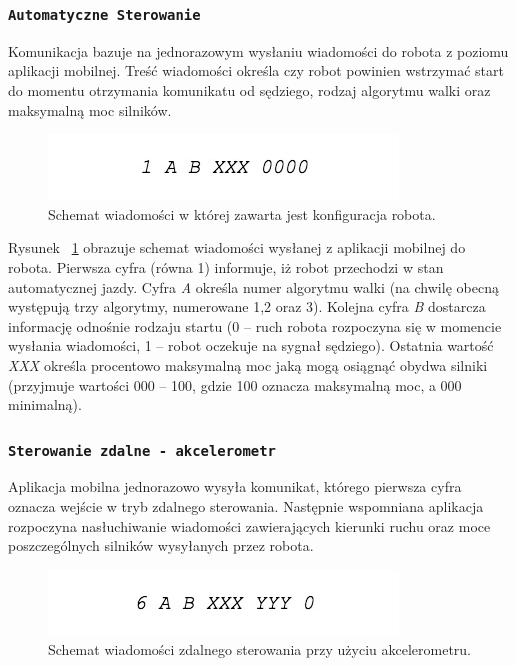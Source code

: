  \subsubsection{\lstinline$Automatyczne Sterowanie$}

Komunikacja bazuje na jednorazowym wysłaniu wiadomości do robota z poziomu aplikacji mobilnej. Treść wiadomości określa czy robot powinien wstrzymać start do momentu otrzymania komunikatu od sędziego, rodzaj algorytmu walki oraz maksymalną moc silników.

\begin{figure}[H]
	\centering
		\includegraphics[width=0.75\linewidth]{pic03/automatic.jpg}
	\caption{Schemat wiadomości w której zawarta jest konfiguracja robota.}
	\label{fig:automatic}	
\end{figure}

Rysunek ~\ref{fig:automatic} obrazuje schemat wiadomości wysłanej z aplikacji mobilnej do robota. Pierwsza cyfra (równa 1) informuje, iż robot przechodzi w stan automatycznej jazdy. Cyfra \textit{A} określa numer algorytmu walki (na chwilę obecną występują trzy algorytmy, numerowane 1,2 oraz 3). Kolejna cyfra \textit{B} dostarcza informację odnośnie rodzaju startu (0 – ruch robota rozpoczyna się w momencie wysłania wiadomości, 1 – robot oczekuje na sygnał sędziego). Ostatnia wartość \textit{XXX} określa procentowo maksymalną moc jaką mogą osiągnąć obydwa silniki (przyjmuje wartości 000 – 100, gdzie 100 oznacza maksymalną moc, a 000 minimalną).

 \subsubsection{\lstinline$Sterowanie zdalne - akcelerometr$}

Aplikacja mobilna jednorazowo wysyła komunikat, którego pierwsza cyfra oznacza wejście w tryb zdalnego sterowania. Następnie wspomniana aplikacja rozpoczyna nasłuchiwanie wiadomości zawierających kierunki ruchu oraz moce poszczególnych silników wysyłanych przez robota.

\begin{figure}[H]
	\centering
		\includegraphics[width=0.75\linewidth]{pic03/accelerometer.jpeg}
	\caption{Schemat wiadomości zdalnego sterowania przy użyciu akcelerometru.}
	\label{fig:accelerometer}	
\end{figure}

